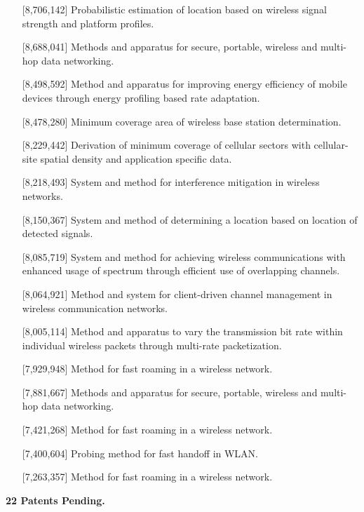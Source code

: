 \begin{resume}
\begin{itemize}
       \item [] [8,706,142] Probabilistic estimation of location based on wireless signal strength and platform
           profiles.
       \item [] [8,688,041] Methods and apparatus for secure, portable, wireless and multi-hop data networking.
       \item [] [8,498,592] Method and apparatus for improving energy efficiency of mobile devices through energy
           profiling based rate adaptation.
       \item [] [8,478,280] Minimum coverage area of wireless base station determination.
       \item [] [8,229,442] Derivation of minimum coverage of cellular sectors with cellular-site spatial density and
           application specific data.
       \item [] [8,218,493] System and method for interference mitigation in wireless networks.
       \item [] [8,150,367] System and method of determining a location based on location of detected signals.
       \item [] [8,085,719] System and method for achieving wireless communications with enhanced usage of spectrum
           through efficient use of overlapping channels.
       \item [] [8,064,921] Method and system for client-driven channel management in wireless communication networks.
       \item [] [8,005,114] Method and apparatus to vary the transmission bit rate within individual wireless packets
           through multi-rate packetization.
       \item [] [7,929,948] Method for fast roaming in a wireless network.
       \item [] [7,881,667] Methods and apparatus for secure, portable, wireless and multi-hop data networking.
       \item [] [7,421,268] Method for fast roaming in a wireless network.
       \item [] [7,400,604] Probing method for fast handoff in WLAN.
       \item [] [7,263,357] Method for fast roaming in a wireless network.
     \end{itemize}

{\bf 22 Patents Pending.}

\newcommand{\mybullet}{\noindent$\circ$~~}
\vspace{-0.7cm}


\end{resume}
